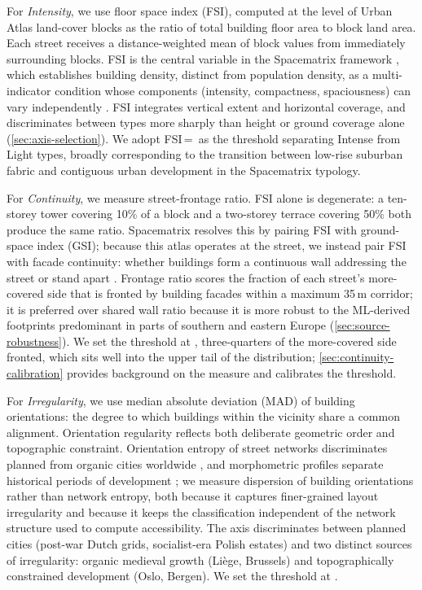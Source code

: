 \documentclass[review,authoryear]{elsarticle}
\begin{document}
For \emph{Intensity}, we use floor space index (FSI), computed at the level of Urban Atlas land-cover blocks as the ratio of total building floor area to block land area. Each street receives a distance-weighted mean of block values from immediately surrounding blocks. FSI is the central variable in the Spacematrix framework \citep{berghauser2010spacematrix}, which establishes building density, distinct from population density, as a multi-indicator condition whose components (intensity, compactness, spaciousness) can vary independently \citep{dovey2014urban, godoyshimizu2021density}. FSI integrates vertical extent and horizontal coverage, and discriminates between types more sharply than height or ground coverage alone (\ref{sec:axis-selection}). We adopt FSI\,=\,\threshFSI{} as the threshold separating Intense from Light types, broadly corresponding to the transition between low-rise suburban fabric and contiguous urban development in the Spacematrix typology.

For \emph{Continuity}, we measure street-frontage ratio. FSI alone is degenerate: a ten-storey tower covering 10\% of a block and a two-storey terrace covering 50\% both produce the same ratio. Spacematrix resolves this by pairing FSI with ground-space index (GSI); because this atlas operates at the street, we instead pair FSI with facade continuity: whether buildings form a continuous wall addressing the street or stand apart \citep{hamaina2012towards, vanderhaegen2017mapping}. Frontage ratio scores the fraction of each street's more-covered side that is fronted by building facades within a maximum 35\,m corridor; it is preferred over shared wall ratio because it is more robust to the ML-derived footprints predominant in parts of southern and eastern Europe (\ref{sec:source-robustness}). We set the threshold at \threshCont{}, three-quarters of the more-covered side fronted, which sits well into the upper tail of the distribution; \ref{sec:continuity-calibration} provides background on the measure and calibrates the threshold.

For \emph{Irregularity}, we use median absolute deviation (MAD) of building orientations: the degree to which buildings within the vicinity share a common alignment. Orientation regularity reflects both deliberate geometric order and topographic constraint. Orientation entropy of street networks discriminates planned from organic cities worldwide \citep{boeing2019urban}, and morphometric profiles separate historical periods of development \citep{dibble2019origin}; we measure dispersion of building orientations rather than network entropy, both because it captures finer-grained layout irregularity and because it keeps the classification independent of the network structure used to compute accessibility. The axis discriminates between planned cities (post-war Dutch grids, socialist-era Polish estates) and two distinct sources of irregularity: organic medieval growth (Liège, Brussels) and topographically constrained development (Oslo, Bergen). We set the threshold at \threshMADdeg\textdegree.
\end{document}
